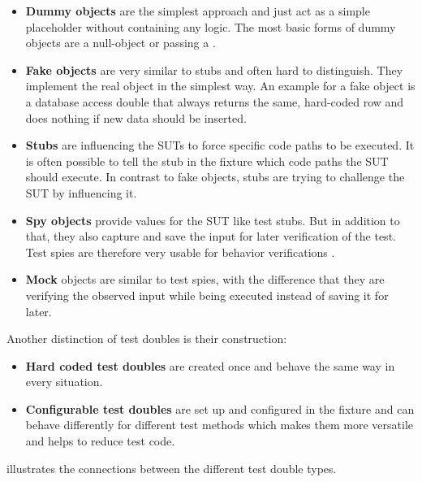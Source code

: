         \begin{itemize}
            \item \textbf{Dummy objects}
                    are the simplest approach and just act as a simple placeholder without containing any logic. 
                    The most basic forms of dummy objects are a null-object or passing a .
            \item \textbf{Fake objects}
                    are very similar to stubs and often hard to distinguish. They implement the real object in the simplest way.
                    An example for a fake object is a database access double that always returns the same, hard-coded row and does nothing if new data should be inserted.
            \item \textbf{Stubs}
                    are influencing the SUTs to force specific code paths to be executed.
                    It is often possible to tell the stub in the fixture which code paths the SUT should execute.
                    In contrast to fake objects, stubs are trying to challenge the SUT by influencing it.
            \item \textbf{Spy objects}
                    provide values for the SUT like test stubs. But in addition to that, they also capture and save the input for later verification of the test.
                    Test spies are therefore very usable for behavior verifications .
            \item \textbf{Mock}
                    objects are similar to test spies, with the difference that they are verifying the observed input while being executed instead of saving it for later.
        \end{itemize}

        Another distinction of test doubles is their construction:
        \begin{itemize}
            \item \textbf{Hard coded test doubles}
                    are created once and behave the same way in every situation.
            \item \textbf{Configurable test doubles}
                    are set up and configured in the fixture and can behave differently for different test methods which makes them more versatile and helps to reduce test code.
        \end{itemize}


         illustrates the connections between the different test double types.

